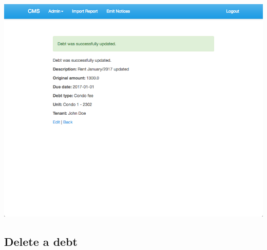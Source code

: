 \begin{itemize}
    \includegraphics[scale=0.25]{./images/ss/debt/edit/5.png}
\end{itemize}

\subsection*{Delete a debt}

